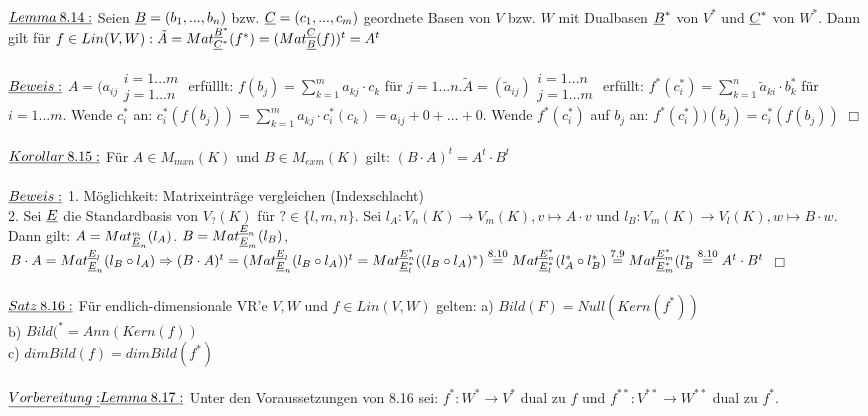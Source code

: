 \documentclass[fleqn, a4paper, 11pt]{scrartcl}
\theoremstyle{definition}
\begin{document}
\\
$\uline{Lemma\:8.14:}$ Seien $\uline{B}=(b_1,...,b_n)$ bzw. $\uline{C}=(c_1,...,c_m)$ geordnete Basen von $V$ bzw. $W$ mit Dualbasen $\uline{B}^{\ast}$ von $V^{\ast}$ und $\uline{C}^{\ast}$ von $W^{\ast}$. Dann gilt für $f\in Lin(V,W):\tilde{A}=Mat_{\uline{C}^{\ast}}^{\uline{B}^{\ast}}(f^{\ast})=(Mat_{\uline{B}}^{\uline{C}}(f))^t=A^t$\\
\\
$\uline{Beweis:}$ $A=(a_{ij}\substack{i=1...m\\j=1...n}$ erfülllt: $f(b_j)=\sum\limits_{k=1}^m a_{kj}\cdot c_k$ für $j=1...n. \tilde{A}=(\tilde{a}_{ij})\substack{i=1...n\\j=1...m}$ erfüllt: $f^{\ast}(c_i^{\ast})=\sum\limits_{k=1}^n \tilde{a}_{ki}\cdot b_k^{\ast}$ für $i=1...m$. Wende $c_i^{\ast}$ an: $c_i^{\ast}(f(b_j))=\sum\limits_{k=1}^m a_{kj}\cdot c_i^{\ast}(c_k)=a_{ij}+0+...+0$. Wende $f^{\ast}(c_i^{\ast})$ auf $b_j$ an: $f^{\ast}(c_i^{\ast}))(b_j)=c_i^{\ast}(f(b_j))$ \hfill $\Box$\\
\\
$\uline{Korollar\:8.15:}$ Für $A\in M_{mxn}(K)$ und $B\in M_{exm}(K)$ gilt: $(B\cdot A)^t=A^t\cdot B^t$\\
\\
$\uline{Beweis:}$ 1. Möglichkeit: Matrixeinträge vergleichen (Indexschlacht)\\
2. Sei $\uline{E}$ die Standardbasis von $V_? (K)$ für $?\in \{l,m,n\}$. Sei $l_A:V_n(K)\rightarrow V_m(K),v\mapsto A\cdot v$ und $l_B:V_m(K)\rightarrow V_l(K),w\mapsto B\cdot w$. Dann gilt: $A=Mat_{\uline{E}_n}^{\uline{}_m}(l_A)$. $B=Mat_{\uline{E}_m}^{\uline{E}_n}(l_B)$, $B\cdot A=Mat_{\uline{E}_n}^{\uline{E}_l}(l_B\circ l_A)\Rightarrow (B\cdot A)^t=(Mat_{\uline{E}_n}^{\uline{E}_l}(l_B\circ l_A))^t=Mat_{\uline{E}_l^{\ast}}^{\uline{E}_n^{\ast}}((l_B\circ l_A)^{\ast})\stackrel{8.10}{=}Mat_{\uline{E}_l^{\ast}}^{\uline{E}_n^{\ast}}(l_A^{\ast}\circ l_B^{\ast})\stackrel{7.9}{=} Mat_{\uline{E}_m^{\ast}}^{\uline{E}_m^{\ast}}(l_B^{\ast}\stackrel{8.10}{=} A^t\cdot B^t$ \hfill $\Box$\\
\\
$\uline{Satz\:8.16:}$ Für endlich-dimensionale VR'e $V,W$ und $f\in Lin(V,W)$ gelten: a) $Bild(F)=Null(Kern(f^{\ast}))$\\
b) $Bild(^{\ast}=Ann(Kern(f))$\\
c) $dim Bild(f)=dim Bild(f^{\ast})$\\
\\
$\uline{Vorbereitung:}\uline{Lemma\:8.17:}$ Unter den Voraussetzungen von 8.16 sei: $f^{\ast}:W^{\ast}\rightarrow V^{\ast}$ dual zu $f$ und $f^{\ast\ast}:V^{\ast\ast}\rightarrow W^{\ast\ast}$ dual zu $f^{\ast}$.\\
\end{document}
